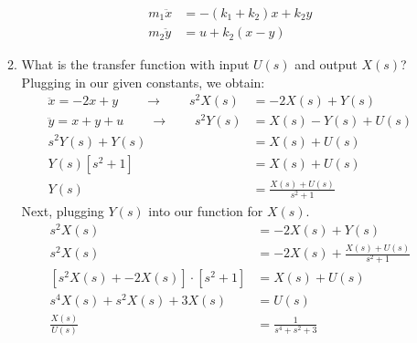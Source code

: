 \documentclass[11pt]{article}
\begin{document}
\begin{enumerate}
\begin{enumerate}
\begin{center}
        \end{center}
        \begin{align*}
            m_1\ddot{x}&=-(k_1+k_2)x+k_2y\\
            m_2\ddot{y}&=u+k_2(x-y)
        \end{align*}
        \item What is the transfer function with input \(U(s)\) and output \(X(s)\)?\\[1em]
        Plugging in our given constants, we obtain:
        \begin{align*}
            \ddot{x}=-2x+y\qquad\rightarrow\qquad s^2X(s)&=-2X(s)+Y(s)\\
            \ddot{y}=x+y+u\qquad\rightarrow\qquad s^2Y(s)&=X(s)-Y(s)+U(s)\\
            s^2Y(s)+Y(s)&=X(s)+U(s)\\
            Y(s)\left[s^2+1\right]&=X(s)+U(s)\\
            Y(s)&=\frac{X(s)+U(s)}{s^2+1}
        \end{align*}
        Next, plugging \(Y(s)\) into our function for \(X(s)\).
        \begin{align*}
            s^2X(s)&=-2X(s)+Y(s)\\
            s^2X(s)&=-2X(s)+\frac{X(s)+U(s)}{s^2+1}\\
            \left[s^2X(s)+-2X(s)\right]\cdot\left[s^2+1\right]&=X(s)+U(s)\\
            s^4X(s)+s^2X(s)+3X(s)&=U(s)\\
            \frac{X(s)}{U(s)}&=\frac{1}{s^4+s^2+3}
        \end{align*}


\end{enumerate}
\end{enumerate}
\end{document}
